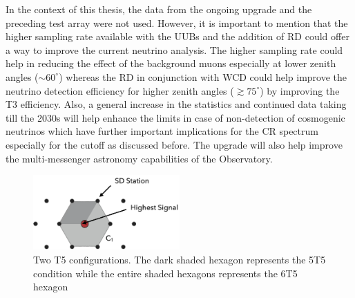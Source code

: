 In the context of this thesis, the data from the ongoing upgrade and the preceding test array were not used. However, it is important to mention that the higher sampling rate available with the UUBs and the addition of RD could offer a way to improve the current neutrino analysis. The higher sampling rate could help in reducing the effect of the background muons especially at lower zenith angles ($\sim 60^{\circ}$) whereas the RD in conjunction with WCD could help improve the neutrino detection efficiency for higher zenith angles ($\gtrsim 75^{\circ}$) by improving the T3 efficiency. Also, a general increase in the statistics and continued data taking till the 2030s will help enhance the limits in case of non-detection of cosmogenic neutrinos which have further important implications for the CR spectrum especially for the cutoff as discussed before. The upgrade will also help improve the multi-messenger astronomy capabilities of the Observatory. 

\begin{figure}[t!]
  \centering
  \includegraphics[width=0.5\textwidth]{thesis_figures/Setup/T5_modes.png}
  \caption{Two T5 configurations. The dark shaded hexagon represents the 5T5 condition while the entire shaded hexagons represents the 6T5 hexagon}
  \label{fig:T5_config}
\end{figure}


